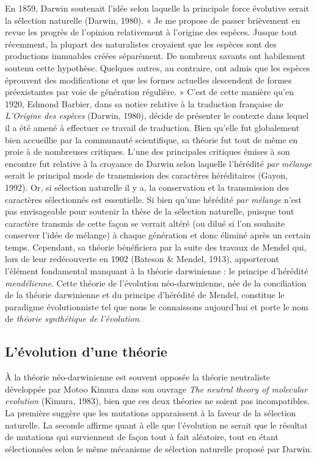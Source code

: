 \documentclass[12pt,twoside]{ugathesis}
\begin{document}
En 1859, Darwin soutenait l'idée selon laquelle la principale force
évolutive serait la sélection naturelle (Darwin, 1980). « Je me propose
de passer brièvement en revue les progrès de l'opinion relativement à
l'origine des espèces. Jusque tout récemment, la plupart des
naturalistes croyaient que les espèces sont des productions immuables
créées séparément. De nombreux savants ont habilement soutenu cette
hypothèse. Quelques autres, au contraire, ont admis que les espèces
éprouvent des modifications et que les formes actuelles descendent de
formes préexistantes par voie de génération régulière. » C'est de cette
manière qu'en 1920, Edmond Barbier, dans sa notice relative à la
traduction française de \emph{L'Origine des espèces} (Darwin, 1980),
décide de présenter le contexte dans lequel il a été amené à effectuer
ce travail de traduction. Bien qu'elle fut globalement bien accueillie
par la communauté scientifique, sa théorie fut tout de même en proie à
de nombreuses critiques. L'une des principales critiques émises à son
encontre fut relative à la croyance de Darwin selon laquelle l'hérédité
\emph{par mélange} serait le principal mode de transmission des
caractères héréditaires (Gayon, 1992). Or, si sélection naturelle il y
a, la conservation et la transmission des caractères sélectionnés est
essentielle. Si bien qu'une hérédité \emph{par mélange} n'est pas
envisageable pour soutenir la thèse de la sélection naturelle, puisque
tout caractère transmis de cette façon se verrait altéré (ou dilué si
l'on souhaite conserver l'idée de mélange) à chaque génération et donc
éliminé après un certain temps. Cependant, sa théorie bénéficiera par la
suite des travaux de Mendel qui, lors de leur redécouverte en 1902
(Bateson \& Mendel, 1913), apporteront l'élément fondamental manquant à
la théorie darwinienne : le principe d'hérédité \emph{mendélienne}.
Cette théorie de l'évolution néo-darwinienne, née de la conciliation de
la théorie darwinienne et du principe d'hérédité de Mendel, constitue le
paradigme évolutionniste tel que nous le connaissons aujourd'hui et
porte le nom de \emph{théorie synthétique de l'évolution}.

\subsection{L'évolution d'une théorie}\label{levolution-dune-theorie}

À la théorie néo-darwinienne est souvent opposée la théorie neutraliste
développée par Motoo Kimura dans son ouvrage \emph{The neutral theory of
molecular evolution} (Kimura, 1983), bien que ces deux théories ne
soient pas incompatibles. La première suggère que les mutations
apparaissent à la faveur de la sélection naturelle. La seconde affirme
quant à elle que l'évolution ne serait que le résultat de mutations qui
surviennent de façon tout à fait aléatoire, tout en étant sélectionnées
selon le même mécanisme de sélection naturelle proposé par Darwin.
\end{document}
